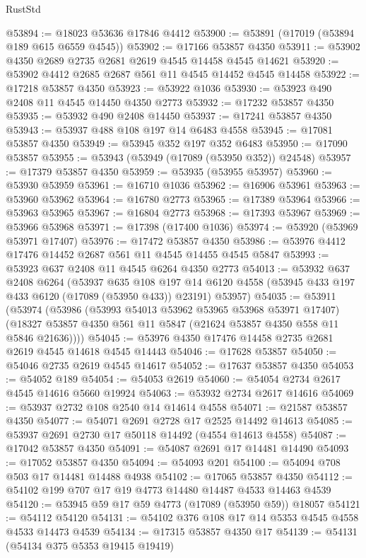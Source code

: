 \begin{lexlean}{RustStd}
\begin{coremodule}
@53894 := @18023 @53636 @17846 @4412
@53900 := @53891 (@17019 (@53894 @189 @615 @6559 @4545))
@53902 := @17166 @53857 @4350
@53911 := @53902 @4350 @2689 @2735 @2681 @2619 @4545 @14458 @4545 @14621
@53920 := @53902 @4412 @2685 @2687 @561 @11 @4545 @14452 @4545 @14458
@53922 := @17218 @53857 @4350
@53923 := @53922 @1036
@53930 := @53923 @490 @2408 @11 @4545 @14450 @4350 @2773
@53932 := @17232 @53857 @4350
@53935 := @53932 @490 @2408 @14450
@53937 := @17241 @53857 @4350
@53943 := @53937 @488 @108 @197 @14 @6483 @4558
@53945 := @17081 @53857 @4350
@53949 := @53945 @352 @197 @352 @6483
@53950 := @17090 @53857
@53955 := @53943 (@53949 (@17089 (@53950 @352)) @24548)
@53957 := @17379 @53857 @4350
@53959 := @53935 (@53955 @53957)
@53960 := @53930 @53959
@53961 := @16710 @1036
@53962 := @16906 @53961
@53963 := @53960 @53962
@53964 := @16780 @2773
@53965 := @17389 @53964
@53966 := @53963 @53965
@53967 := @16804 @2773
@53968 := @17393 @53967
@53969 := @53966 @53968
@53971 := @17398 (@17400 @1036)
@53974 := @53920 (@53969 @53971 @17407)
@53976 := @17472 @53857 @4350
@53986 := @53976 @4412 @17476 @14452 @2687 @561 @11 @4545 @14455 @4545 @5847
@53993 := @53923 @637 @2408 @11 @4545 @6264 @4350 @2773
@54013 := @53932
    @637
    @2408
    @6264
    (@53937
      @635
      @108
      @197
      @14
      @6120
      @4558
      (@53945 @433 @197 @433 @6120 (@17089 (@53950 @433)) @23191)
      @53957)
@54035 := @53911
    (@53974
      (@53986
        (@53993 @54013 @53962 @53965 @53968 @53971 @17407)
        (@18327 @53857 @4350 @561 @11 @5847 (@21624 @53857 @4350 @558 @11 @5846 @21636))))
@54045 := @53976 @4350 @17476 @14458 @2735 @2681 @2619 @4545 @14618 @4545 @14443
@54046 := @17628 @53857
@54050 := @54046 @2735 @2619 @4545 @14617
@54052 := @17637 @53857 @4350
@54053 := @54052 @189
@54054 := @54053 @2619
@54060 := @54054 @2734 @2617 @4545 @14616 @5660 @19924
@54063 := @53932 @2734 @2617 @14616
@54069 := @53937 @2732 @108 @2540 @14 @14614 @4558
@54071 := @21587 @53857 @4350
@54077 := @54071 @2691 @2728 @17 @2525 @14492 @14613
@54085 := @53937 @2691 @2730 @17 @50118 @14492 (@4554 @14613 @4558)
@54087 := @17042 @53857 @4350
@54091 := @54087 @2691 @17 @14481 @14490
@54093 := @17052 @53857 @4350
@54094 := @54093 @201
@54100 := @54094 @708 @503 @17 @14481 @14488 @4938
@54102 := @17065 @53857 @4350
@54112 := @54102 @199 @707 @17 @19 @4773 @14480 @14487 @4533 @14463 @4539
@54120 := @53945 @59 @17 @59 @4773 (@17089 (@53950 @59)) @18057
@54121 := @54112 @54120
@54131 := @54102 @376 @108 @17 @14 @5353 @4545 @4558 @4533 @14473 @4539
@54134 := @17315 @53857 @4350 @17
@54139 := @54131 (@54134 @375 @5353 @19415 @19419)

\end{coremodule}
\end{lexlean}

